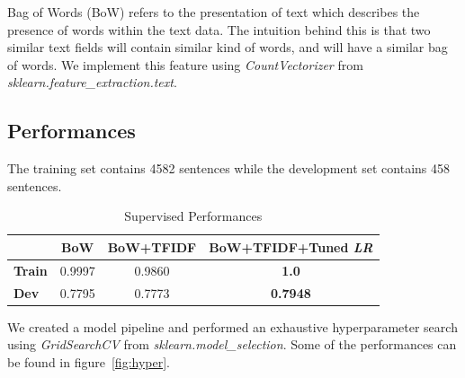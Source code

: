 Bag of Words (BoW) refers to the presentation of text which describes the presence of words within the text data. The intuition behind this is that two similar text fields will contain similar kind of words, and will have a similar bag of words. We implement this feature using \textit{CountVectorizer} from \textit{sklearn.feature\_extraction.text}.


\subsection{\textbf{Performances}}

The training set contains 4582 sentences while the development set contains 458 sentences.

\begin{table}[ht]  %
\centering  %
\caption{Supervised Performances}
\begin{tabular}{lccc}
\hline
&    \textbf{BoW} & \textbf{BoW+TFIDF} & \textbf{BoW+TFIDF+Tuned \textit{LR}}\\
\hline
 \textbf{Train}   & 0.9997 &  0.9860 &  \textbf{1.0}   \\
 \textbf{Dev} &  0.7795 &  0.7773  &  \textbf{0.7948}   \\
\hline
\end{tabular}
\label{tab:supervised}
\end{table}

We created a model pipeline and performed an exhaustive hyperparameter search using \textit{GridSearchCV} from \textit{sklearn.model\_selection}. Some of the performances can be found in figure~\ref{fig:hyper}.


